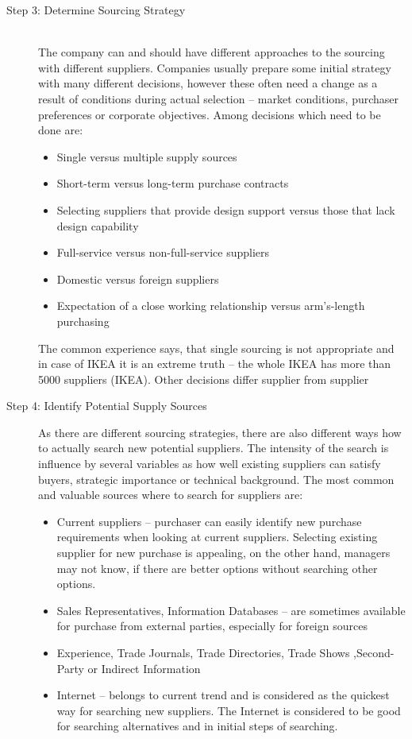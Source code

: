 \documentclass[oneside,12pt]{article}%
\begin{document}
\begin{description}
  \item[Step 3: Determine Sourcing Strategy] \hfill \\
  The company can and should have different approaches to the sourcing with different suppliers. Companies usually prepare some initial strategy with many different decisions, however these often need a change as a result of conditions during actual selection – market conditions, purchaser preferences or corporate objectives. Among decisions which need to be done are:
  \begin{itemize}
  \item Single versus multiple supply sources
  \item Short-term versus long-term purchase contracts
  \item Selecting suppliers that provide design support versus those that lack design capability
  \item Full-service versus non-full-service suppliers
  \item Domestic versus foreign suppliers
  \item Expectation of a close working relationship versus arm’s-length purchasing
  \end{itemize}
  The common experience says, that single sourcing is not appropriate and in case of IKEA it is an extreme truth – the whole IKEA has more than 5000 suppliers (IKEA). Other decisions differ supplier from supplier


  \item[Step 4: Identify Potential Supply Sources]
  As there are different sourcing strategies, there are also different ways how to actually search new potential suppliers. The intensity of the search is influence by several variables as how well existing suppliers can satisfy buyers, strategic importance or technical background. The most common and valuable sources where to search for suppliers are:
  \begin{itemize}
    \item Current suppliers – purchaser can easily identify new purchase requirements when looking at current suppliers. Selecting existing supplier for new purchase is appealing, on the other hand, managers may not know, if there are better options without searching other options.
    \item Sales Representatives, Information Databases – are sometimes available for purchase from external parties, especially for foreign sources
    \item Experience, Trade Journals, Trade Directories, Trade Shows ,Second-Party or Indirect Information
    \item Internet – belongs to current trend and is considered as the quickest way for searching new suppliers. The Internet is considered to be good for searching alternatives and in initial steps of searching.


\end{itemize}
\end{description}
\end{document}
